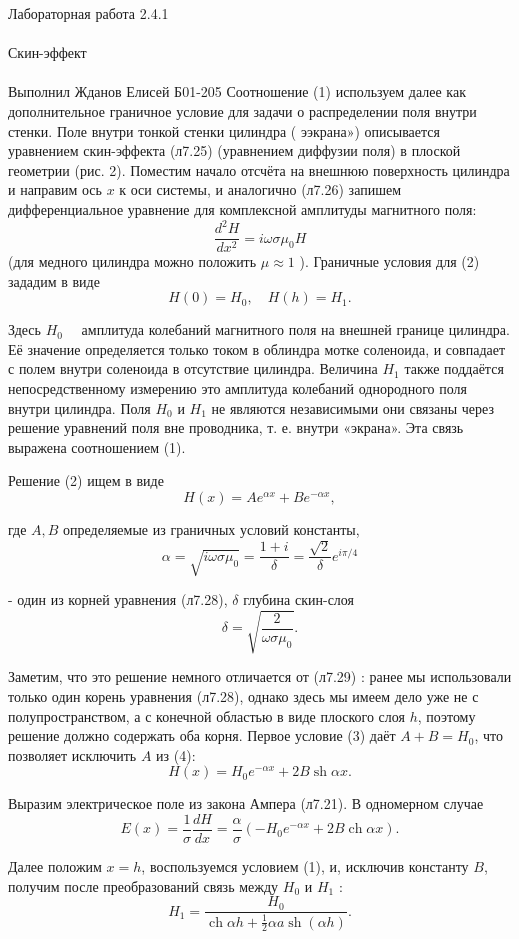 \documentclass{astroedu-lab}
\begin{document}
\begin{problem}{\huge Лабораторная работа 2.4.1\\\\Скин-эффект\\\\Выполнил Жданов Елисей Б01-205}
Соотношение (1) используем далее как дополнительное граничное условие для задачи о распределении поля внутри стенки.
Поле внутри тонкой стенки цилиндра ( ээкрана») описывается уравнением скин-эффекта (л7.25) (уравнением диффузии поля) в плоской геометрии (рис. 2). Поместим начало отсчёта на внешнюю поверхность цилиндра и направим ось $x$ к оси системы, и аналогично (л7.26) запишем дифференциальное уравнение для комплексной амплитуды магнитного поля:
$$
\frac{d^2 H}{d x^2}=i \omega \sigma \mu_0 H
$$
(для медного цилиндра можно положить $\mu \approx 1$ ).
Граничные условия для (2) зададим в виде
$$
H(0)=H_0, \quad H(h)=H_1 .
$$

Здесь $H_0 \quad$ амплитуда колебаний магнитного поля на внешней границе цилиндра. Её значение определяется только током в облиндра мотке соленоида, и совпадает с полем внутри соленоида в отсутствие цилиндра. Величина $H_1$ также поддаётся непосредственному измерению это амплитуда колебаний однородного поля внутри цилиндра. Поля $H_0$ и $H_1$ не являются независимыми они связаны через решение уравнений поля вне проводника, т. е. внутри «экрана». Эта связь выражена соотношением (1).

Решение (2) ищем в виде
$$
H(x)=A e^{\alpha x}+B e^{-\alpha x},
$$

где $A, B$ определяемые из граничных условий константы,
$$
\alpha=\sqrt{i \omega \sigma \mu_0}=\frac{1+i}{\delta}=\frac{\sqrt{2}}{\delta} e^{i \pi / 4}
$$

- один из корней уравнения (л7.28), $\delta$ глубина скин-слоя
$$
\delta=\sqrt{\frac{2}{\omega \sigma \mu_0}} .
$$

Заметим, что это решение немного отличается от (л7.29) : ранее мы использовали только один корень уравнения (л7.28), однако здесь мы имеем дело уже не с полупространством, а с конечной областью в виде плоского слоя $h$, поэтому решение должно содержать оба корня.
Первое условие (3) даёт $A+B=H_0$, что позволяет исключить $A$ из (4):
$$
H(x)=H_0 e^{-\alpha x}+2 B \operatorname{sh} \alpha x .
$$

Выразим электрическое поле из закона Ампера (л7.21). В одномерном случае
$$
E(x)=\frac{1}{\sigma} \frac{d H}{d x}=\frac{\alpha}{\sigma}\left(-H_0 e^{-\alpha x}+2 B \operatorname{ch} \alpha x\right) .
$$





Далее положим $x=h$, воспользуемся условием (1), и, исключив константу $B$, получим после преобразований связь между $H_0$ и $H_1$ :
$$
H_1=\frac{H_0}{\operatorname{ch} \alpha h+\frac{1}{2} \alpha a \operatorname{sh}(\alpha h)} .
$$


\end{problem}
\end{document}

